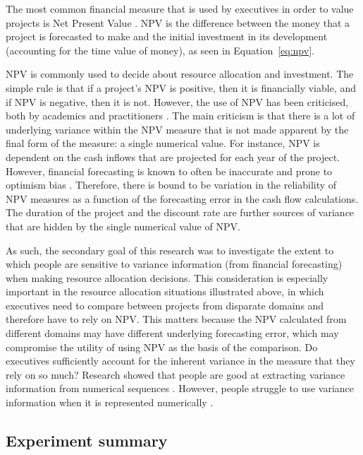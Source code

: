 \documentclass[a4paper, nobind, dvipsnames]{templates/ociamthesis}
\theoremstyle{definition}
\theoremstyle{definition}
\theoremstyle{definition}
\theoremstyle{definition}
\theoremstyle{remark}
\begin{document}
The most common financial measure that is used by executives in order to value
projects is Net Present Value \autocite[NPV;][]{graham2001}. NPV is the difference between
the money that a project is forecasted to make and the initial investment in its
development (accounting for the time value of money), as seen in
Equation~\eqref{eq:npv}.

NPV is commonly used to decide about resource allocation and investment. The
simple rule is that if a project's NPV is positive, then it is financially
viable, and if NPV is negative, then it is not. However, the use of NPV has been
criticised, both by academics and practitioners \autocite{fox2008,willigers2017}. The
main criticism is that there is a lot of underlying variance within the NPV
measure that is not made apparent by the final form of the measure: a single
numerical value. For instance, NPV is dependent on the cash inflows that are
projected for each year of the project. However, financial forecasting is known
to often be inaccurate and prone to optimism bias \autocite{lovallo2003,puri2007}.
Therefore, there is bound to be variation in the reliability of NPV measures as
a function of the forecasting error in the cash flow calculations. The duration
of the project and the discount rate are further sources of variance that are
hidden by the single numerical value of NPV.

As such, the secondary goal of this research was to investigate the extent to
which people are sensitive to variance information (from financial forecasting)
when making resource allocation decisions. This consideration is especially
important in the resource allocation situations illustrated above, in which
executives need to compare between projects from disparate domains and therefore
have to rely on NPV. This matters because the NPV calculated from different
domains may have different underlying forecasting error, which may compromise
the utility of using NPV as the basis of the comparison. Do executives
sufficiently account for the inherent variance in the measure that they rely on
so much? Research showed that people are good at extracting variance information
from numerical sequences \autocite{rosenbaum2020}. However, people struggle to use
variance information when it is represented numerically \autocite{galesic2010,konold1993,vivalt2018,batteux2020}.

\hypertarget{experiment-summary}{%
\subsection{Experiment summary}\label{experiment-summary}}
\end{document}
